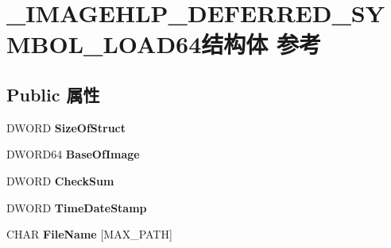 \hypertarget{struct___i_m_a_g_e_h_l_p___d_e_f_e_r_r_e_d___s_y_m_b_o_l___l_o_a_d64}{}\section{\+\_\+\+I\+M\+A\+G\+E\+H\+L\+P\+\_\+\+D\+E\+F\+E\+R\+R\+E\+D\+\_\+\+S\+Y\+M\+B\+O\+L\+\_\+\+L\+O\+A\+D64结构体 参考}
\label{struct___i_m_a_g_e_h_l_p___d_e_f_e_r_r_e_d___s_y_m_b_o_l___l_o_a_d64}
\subsection*{Public 属性}
\begin{DoxyCompactItemize}
\item 
\mbox{\label{struct___i_m_a_g_e_h_l_p___d_e_f_e_r_r_e_d___s_y_m_b_o_l___l_o_a_d64_a48a775ccd9c153a16c279559353a0e84}} 
D\+W\+O\+RD {\bfseries Size\+Of\+Struct}
\item 
\mbox{\label{struct___i_m_a_g_e_h_l_p___d_e_f_e_r_r_e_d___s_y_m_b_o_l___l_o_a_d64_a4a3a3ec5e12f9b963de835cc5c0c73b4}} 
D\+W\+O\+R\+D64 {\bfseries Base\+Of\+Image}
\item 
\mbox{\label{struct___i_m_a_g_e_h_l_p___d_e_f_e_r_r_e_d___s_y_m_b_o_l___l_o_a_d64_ad02480d26e6ff0f72970b97432e44e17}} 
D\+W\+O\+RD {\bfseries Check\+Sum}
\item 
\mbox{\label{struct___i_m_a_g_e_h_l_p___d_e_f_e_r_r_e_d___s_y_m_b_o_l___l_o_a_d64_a7ce7eb23ef5e599a77b44ed813f6895c}} 
D\+W\+O\+RD {\bfseries Time\+Date\+Stamp}
\item 
\mbox{\label{struct___i_m_a_g_e_h_l_p___d_e_f_e_r_r_e_d___s_y_m_b_o_l___l_o_a_d64_aa7eca923935353fd33db37e14c042143}} 
C\+H\+AR {\bfseries File\+Name} \mbox{[}M\+A\+X\+\_\+\+P\+A\+TH\mbox{]}
\item 

\end{DoxyCompactItemize}
